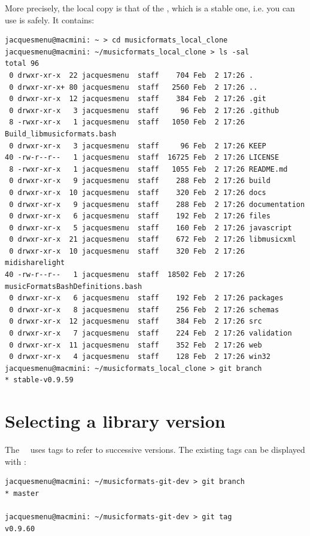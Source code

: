 More precisely, the local copy is that of the , which is a stable one, i.e. you can use is safely. It contains:
\begin{lstlisting}[language=Terminal]
jacquesmenu@macmini: ~ > cd musicformats_local_clone
jacquesmenu@macmini: ~/musicformats_local_clone > ls -sal
total 96
 0 drwxr-xr-x  22 jacquesmenu  staff    704 Feb  2 17:26 .
 0 drwxr-xr-x+ 80 jacquesmenu  staff   2560 Feb  2 17:26 ..
 0 drwxr-xr-x  12 jacquesmenu  staff    384 Feb  2 17:26 .git
 0 drwxr-xr-x   3 jacquesmenu  staff     96 Feb  2 17:26 .github
 8 -rwxr-xr-x   1 jacquesmenu  staff   1050 Feb  2 17:26 Build_libmusicformats.bash
 0 drwxr-xr-x   3 jacquesmenu  staff     96 Feb  2 17:26 KEEP
40 -rw-r--r--   1 jacquesmenu  staff  16725 Feb  2 17:26 LICENSE
 8 -rwxr-xr-x   1 jacquesmenu  staff   1055 Feb  2 17:26 README.md
 0 drwxr-xr-x   9 jacquesmenu  staff    288 Feb  2 17:26 build
 0 drwxr-xr-x  10 jacquesmenu  staff    320 Feb  2 17:26 docs
 0 drwxr-xr-x   9 jacquesmenu  staff    288 Feb  2 17:26 documentation
 0 drwxr-xr-x   6 jacquesmenu  staff    192 Feb  2 17:26 files
 0 drwxr-xr-x   5 jacquesmenu  staff    160 Feb  2 17:26 javascript
 0 drwxr-xr-x  21 jacquesmenu  staff    672 Feb  2 17:26 libmusicxml
 0 drwxr-xr-x  10 jacquesmenu  staff    320 Feb  2 17:26 midisharelight
40 -rw-r--r--   1 jacquesmenu  staff  18502 Feb  2 17:26 musicFormatsBashDefinitions.bash
 0 drwxr-xr-x   6 jacquesmenu  staff    192 Feb  2 17:26 packages
 0 drwxr-xr-x   8 jacquesmenu  staff    256 Feb  2 17:26 schemas
 0 drwxr-xr-x  12 jacquesmenu  staff    384 Feb  2 17:26 src
 0 drwxr-xr-x   7 jacquesmenu  staff    224 Feb  2 17:26 validation
 0 drwxr-xr-x  11 jacquesmenu  staff    352 Feb  2 17:26 web
 0 drwxr-xr-x   4 jacquesmenu  staff    128 Feb  2 17:26 win32
jacquesmenu@macmini: ~/musicformats_local_clone > git branch
* stable-v0.9.59
\end{lstlisting}


\section{Selecting a library version}

The \mf\ \repo\ uses tags to refer to successive versions. The existing tags can be displayed with :
\begin{lstlisting}[language=Terminal]
jacquesmenu@macmini: ~/musicformats-git-dev > git branch
* master

jacquesmenu@macmini: ~/musicformats-git-dev > git tag
v0.9.60
\end{lstlisting}

